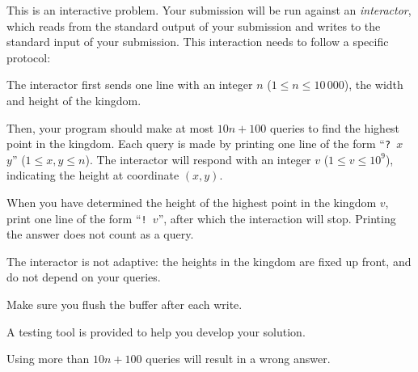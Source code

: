 
    This is an interactive problem.
    Your submission will be run against an \emph{interactor},
    which reads from the standard output of your submission
    and writes to the standard input of your submission.
    This interaction needs to follow a specific protocol:

    The interactor first sends
    one line with an integer $n$ ($1\leq n\leq 10\,000$),
    the width and height of the kingdom.

    Then, your program should make at most $10n+100$ queries to find the highest point in the kingdom.
    Each query is made by printing one line of the form ``\texttt{?~$x$~$y$}'' ($1\leq x,y\leq n$).
    The interactor will respond with an integer $v$ ($1 \leq v \leq 10^9$),
    indicating the height at coordinate $(x, y)$.

    When you have determined the height of the highest point in the kingdom $v$,
    print one line of the form ``\texttt{!~$v$}'',
    after which the interaction will stop.
    Printing the answer does not count as a query.

    The interactor is not adaptive: the heights in the kingdom are fixed up front, and do not depend on your queries.

    Make sure you flush the buffer after each write.

    A testing tool is provided to help you develop your solution.

    Using more than $10n+100$ queries will result in a wrong answer.

